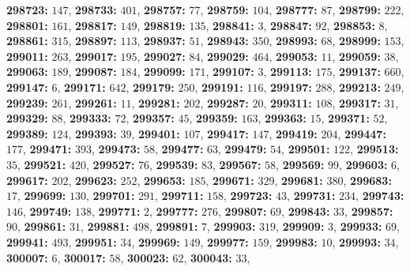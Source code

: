 \textsf{\bfseries 298723:} $147$, \textsf{\bfseries 298733:} $401$, \textsf{\bfseries 298757:} $77$, \textsf{\bfseries 298759:} $104$, \textsf{\bfseries 298777:} $87$, \textsf{\bfseries 298799:} $222$, \textsf{\bfseries 298801:} $161$, \textsf{\bfseries 298817:} $149$, \textsf{\bfseries 298819:} $135$, \textsf{\bfseries 298841:} $3$, \textsf{\bfseries 298847:} $92$, \textsf{\bfseries 298853:} $8$, \textsf{\bfseries 298861:} $315$, \textsf{\bfseries 298897:} $113$, \textsf{\bfseries 298937:} $51$, \textsf{\bfseries 298943:} $350$, \textsf{\bfseries 298993:} $68$, \textsf{\bfseries 298999:} $153$, \textsf{\bfseries 299011:} $263$, \textsf{\bfseries 299017:} $195$, \textsf{\bfseries 299027:} $84$, \textsf{\bfseries 299029:} $464$, \textsf{\bfseries 299053:} $11$, \textsf{\bfseries 299059:} $38$, \textsf{\bfseries 299063:} $189$, \textsf{\bfseries 299087:} $184$, \textsf{\bfseries 299099:} $171$, \textsf{\bfseries 299107:} $3$, \textsf{\bfseries 299113:} $175$, \textsf{\bfseries 299137:} $660$, \textsf{\bfseries 299147:} $6$, \textsf{\bfseries 299171:} $642$, \textsf{\bfseries 299179:} $250$, \textsf{\bfseries 299191:} $116$, \textsf{\bfseries 299197:} $288$, \textsf{\bfseries 299213:} $249$, \textsf{\bfseries 299239:} $261$, \textsf{\bfseries 299261:} $11$, \textsf{\bfseries 299281:} $202$, \textsf{\bfseries 299287:} $20$, \textsf{\bfseries 299311:} $108$, \textsf{\bfseries 299317:} $31$, \textsf{\bfseries 299329:} $88$, \textsf{\bfseries 299333:} $72$, \textsf{\bfseries 299357:} $45$, \textsf{\bfseries 299359:} $163$, \textsf{\bfseries 299363:} $15$, \textsf{\bfseries 299371:} $52$, \textsf{\bfseries 299389:} $124$, \textsf{\bfseries 299393:} $39$, \textsf{\bfseries 299401:} $107$, \textsf{\bfseries 299417:} $147$, \textsf{\bfseries 299419:} $204$, \textsf{\bfseries 299447:} $177$, \textsf{\bfseries 299471:} $393$, \textsf{\bfseries 299473:} $58$, \textsf{\bfseries 299477:} $63$, \textsf{\bfseries 299479:} $54$, \textsf{\bfseries 299501:} $122$, \textsf{\bfseries 299513:} $35$, \textsf{\bfseries 299521:} $420$, \textsf{\bfseries 299527:} $76$, \textsf{\bfseries 299539:} $83$, \textsf{\bfseries 299567:} $58$, \textsf{\bfseries 299569:} $99$, \textsf{\bfseries 299603:} $6$, \textsf{\bfseries 299617:} $202$, \textsf{\bfseries 299623:} $252$, \textsf{\bfseries 299653:} $185$, \textsf{\bfseries 299671:} $329$, \textsf{\bfseries 299681:} $380$, \textsf{\bfseries 299683:} $17$, \textsf{\bfseries 299699:} $130$, \textsf{\bfseries 299701:} $291$, \textsf{\bfseries 299711:} $158$, \textsf{\bfseries 299723:} $43$, \textsf{\bfseries 299731:} $234$, \textsf{\bfseries 299743:} $146$, \textsf{\bfseries 299749:} $138$, \textsf{\bfseries 299771:} $2$, \textsf{\bfseries 299777:} $276$, \textsf{\bfseries 299807:} $69$, \textsf{\bfseries 299843:} $33$, \textsf{\bfseries 299857:} $90$, \textsf{\bfseries 299861:} $31$, \textsf{\bfseries 299881:} $498$, \textsf{\bfseries 299891:} $7$, \textsf{\bfseries 299903:} $319$, \textsf{\bfseries 299909:} $3$, \textsf{\bfseries 299933:} $69$, \textsf{\bfseries 299941:} $493$, \textsf{\bfseries 299951:} $34$, \textsf{\bfseries 299969:} $149$, \textsf{\bfseries 299977:} $159$, \textsf{\bfseries 299983:} $10$, \textsf{\bfseries 299993:} $34$, \textsf{\bfseries 300007:} $6$, \textsf{\bfseries 300017:} $58$, \textsf{\bfseries 300023:} $62$, \textsf{\bfseries 300043:} $33$, 
